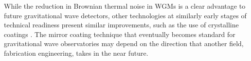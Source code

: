 While the reduction in Brownian thermal noise in \glspl{WGM} is a clear advantage to future gravitational wave detectors, other technologies at similarly early stages of technical readiness present similar improvements, such as the use of crystalline coatings \cite{Cole2013}. The mirror coating technique that eventually becomes standard for gravitational wave observatories may depend on the direction that another field, fabrication engineering, takes in the near future.